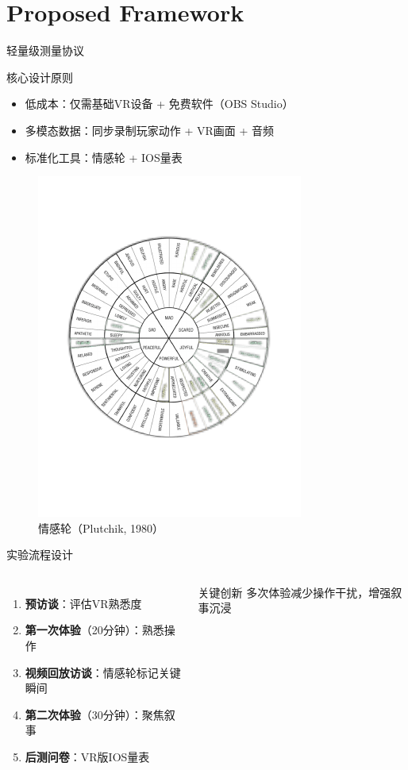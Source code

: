 \documentclass[aspectratio=169,xcolor=dvipsnames]{beamer}
\begin{document}
\section{Proposed Framework}

\begin{frame}{轻量级测量协议}
    \begin{block}{核心设计原则}
        \begin{itemize}
            \item 低成本：仅需基础VR设备 + 免费软件（OBS Studio）
            \item 多模态数据：同步录制玩家动作 + VR画面 + 音频
            \item 标准化工具：情感轮 + IOS量表
        \end{itemize}
    \end{block}
    
    \begin{figure}
        \includegraphics[width=0.3\linewidth]{g1434.pdf}  %
        \caption{情感轮（Plutchik, 1980）}
    \end{figure}
\end{frame}


\begin{frame}{实验流程设计}
    \begin{columns}[c]
        \begin{enumerate}
            \item \textbf{预访谈}：评估VR熟悉度
            \item \textbf{第一次体验}（20分钟）：熟悉操作
            \item \textbf{视频回放访谈}：情感轮标记关键瞬间
            \item \textbf{第二次体验}（30分钟）：聚焦叙事
            \item \textbf{后测问卷}：VR版IOS量表
        \end{enumerate}
        
        \begin{alertblock}{关键创新}
            多次体验减少操作干扰，增强叙事沉浸
        \end{alertblock}
    \end{columns}
\end{frame}
\end{document}
